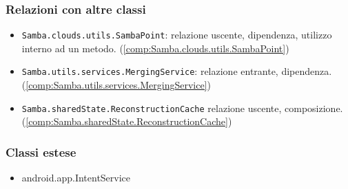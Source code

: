 \subsubsection{Relazioni con altre classi}
\begin{itemize}
	\item \texttt{Samba.clouds.utils.SambaPoint}: relazione uscente, dipendenza, utilizzo interno ad un metodo. (\ref{comp:Samba.clouds.utils.SambaPoint})
	\item \texttt{Samba.utils.services.MergingService}: relazione entrante, dipendenza. (\ref{comp:Samba.utils.services.MergingService})
	\item \texttt{Samba.sharedState.ReconstructionCache} relazione uscente, composizione. (\ref{comp:Samba.sharedState.ReconstructionCache})
\end{itemize}
\subsubsection{Classi estese}
\begin{itemize}
	\item android.app.IntentService
\end{itemize}



